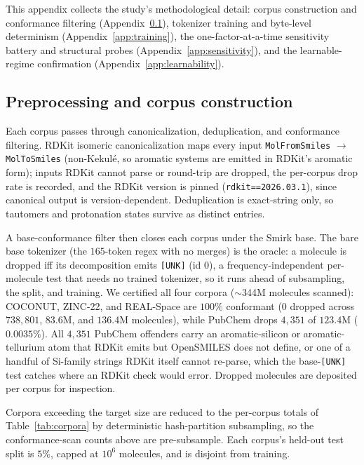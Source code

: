 \documentclass{article}
\begin{document}
This appendix collects the study's methodological detail: corpus
construction and conformance filtering (Appendix~\ref{app:preproc}), tokenizer
training and byte-level determinism (Appendix~\ref{app:training}), the
one-factor-at-a-time sensitivity battery and structural probes
(Appendix~\ref{app:sensitivity}), and the learnable-regime confirmation
(Appendix~\ref{app:learnability}).

\subsection{Preprocessing and corpus construction}\label{app:preproc}

Each corpus passes through canonicalization, deduplication, and
conformance filtering.
RDKit isomeric canonicalization maps every input \texttt{MolFromSmiles}
$\to$ \texttt{MolToSmiles} (non-Kekul\'e, so aromatic systems are
emitted in RDKit's aromatic form); inputs RDKit cannot parse or round-trip
are dropped, the per-corpus drop rate is recorded, and the RDKit version is
pinned (\texttt{rdkit==2026.03.1}), since canonical output is version-dependent. Deduplication is
exact-string only, so tautomers and protonation states survive as distinct
entries.

A base-conformance filter then closes each corpus under the Smirk base. The
bare base tokenizer (the $165$-token regex with no merges) is the oracle: a
molecule is dropped iff its decomposition emits \texttt{[UNK]} (id $0$), a
frequency-independent per-molecule test that needs no trained tokenizer, so it
runs ahead of subsampling, the split, and training. We certified
all four corpora ($\sim$344M molecules scanned): COCONUT, ZINC-22, and
REAL-Space are $100\%$ conformant ($0$ dropped across $738{,}801$, $83.6$M, and
$136.4$M molecules), while PubChem drops $4{,}351$ of $123.4$M ($0.0035\%$).
All $4{,}351$ PubChem offenders carry an aromatic-silicon or aromatic-tellurium
atom that RDKit emits but OpenSMILES does not define, or one of a handful of
Si-family strings RDKit itself cannot re-parse, which the base-\texttt{[UNK]}
test catches where an RDKit check would error. Dropped
molecules are deposited per corpus for inspection.

Corpora exceeding the target size are reduced to the per-corpus totals
of Table~\ref{tab:corpora} by deterministic hash-partition subsampling,
so the conformance-scan counts above are pre-subsample. Each corpus's held-out
test split is $5\%$, capped at $10^6$ molecules, and is disjoint from training.
\end{document}
